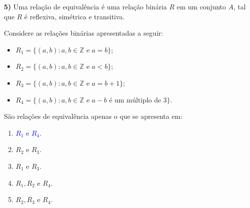 \documentclass[12pt,a4paper]{article}
\begin{document}
\textbf{5) } Uma relação de equivalência é uma relação binária $R$ em um conjunto $A$, tal que $R$ é reflexiva, simétrica e transitiva.

Considere as relações binárias apresentadas a seguir:
\begin{itemize}
    \item $R_1 = \{(a, b) : a, b \in \mathbb{Z} \text{ e } a = b\}$;
    \item $R_2 = \{(a, b) : a, b \in \mathbb{Z} \text{ e } a < b\}$;
    \item $R_3 = \{(a, b) : a, b \in \mathbb{Z} \text{ e } a = b + 1\}$;
    \item $R_4 = \{(a, b) : a, b \in \mathbb{Z} \text{ e } a - b \text{ é um múltiplo de 3}\}$.
\end{itemize}

São relações de equivalência apenas o que se apresenta em:
\begin{enumerate}[label=\Alph*)]
    \item[\textcolor{blue}{\textbf{A)}}] \textcolor{blue}{$R_1$ e $R_4$.}
    \item $R_2$ e $R_3$.
    \item $R_1$ e $R_3$. 
    \item $R_1, R_2$ e $R_4$.
    \item $R_2, R_3$ e $R_4$.
\end{enumerate} 
\end{document}
